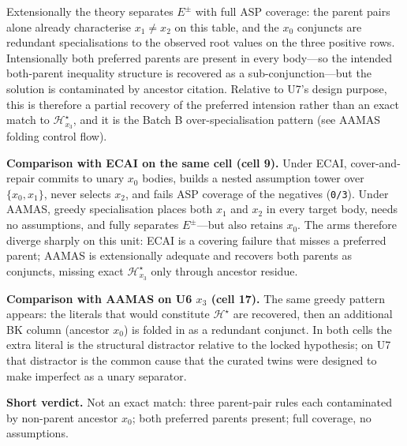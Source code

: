 \documentclass[11pt]{article}
\begin{document}
Extensionally the theory separates \(E^\pm\) with full ASP coverage: the parent pairs alone already characterise \(x_1\neq x_2\) on this table, and the \(x_0\) conjuncts are redundant specialisations to the observed root values on the three positive rows. Intensionally both preferred parents are present in every body---so the intended both-parent inequality structure is recovered as a sub-conjunction---but the solution is contaminated by ancestor citation. Relative to U7's design purpose, this is therefore a partial recovery of the preferred intension rather than an exact match to \(\mathcal{H}_{x_3}^\star\), and it is the Batch B over-specialisation pattern (see AAMAS folding control flow).

\textbf{Comparison with ECAI on the same cell (cell 9).} Under ECAI, cover-and-repair commits to unary \(x_0\) bodies, builds a nested assumption tower over \(\{x_0,x_1\}\), never selects \(x_2\), and fails ASP coverage of the negatives (\texttt{0/3}). Under AAMAS, greedy specialisation places both \(x_1\) and \(x_2\) in every target body, needs no assumptions, and fully separates \(E^\pm\)---but also retains \(x_0\). The arms therefore diverge sharply on this unit: ECAI is a covering failure that misses a preferred parent; AAMAS is extensionally adequate and recovers both parents as conjuncts, missing exact \(\mathcal{H}_{x_3}^\star\) only through ancestor residue.

\textbf{Comparison with AAMAS on U6 \(x_3\) (cell 17).} The same greedy pattern appears: the literals that would constitute \(\mathcal{H}^\star\) are recovered, then an additional BK column (ancestor \(x_0\)) is folded in as a redundant conjunct. In both cells the extra literal is the structural distractor relative to the locked hypothesis; on U7 that distractor is the common cause that the curated twins were designed to make imperfect as a unary separator.

\textbf{Short verdict.} Not an exact match: three parent-pair rules each contaminated by non-parent ancestor \(x_0\); both preferred parents present; full coverage, no assumptions.
\end{document}
